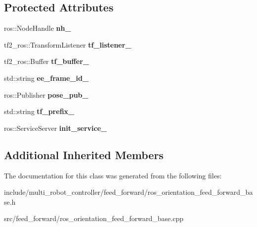 \subsection*{Protected Attributes}
\begin{DoxyCompactItemize}
\item 
\mbox{\label{classRosOrientationFeedForwardBase_afa860a801df238863c9f4d914b84cad2}} 
ros\+::\+Node\+Handle {\bfseries nh\+\_\+}
\item 
\mbox{\label{classRosOrientationFeedForwardBase_a056eabe353a9b022e78f00432cc0451e}} 
tf2\+\_\+ros\+::\+Transform\+Listener {\bfseries tf\+\_\+listener\+\_\+}
\item 
\mbox{\label{classRosOrientationFeedForwardBase_af31a9db484070b9498d11c89d3c60def}} 
tf2\+\_\+ros\+::\+Buffer {\bfseries tf\+\_\+buffer\+\_\+}
\item 
\mbox{\label{classRosOrientationFeedForwardBase_a746bcb2db8165ad31cbe285be7ed9c23}} 
std\+::string {\bfseries ee\+\_\+frame\+\_\+id\+\_\+}
\item 
\mbox{\label{classRosOrientationFeedForwardBase_a71880189563e228e26ce9561e085a625}} 
ros\+::\+Publisher {\bfseries pose\+\_\+pub\+\_\+}
\item 
\mbox{\label{classRosOrientationFeedForwardBase_a0ac4ea0415e293dbe56fa214c1acb3fc}} 
std\+::string {\bfseries tf\+\_\+prefix\+\_\+}
\item 
\mbox{\label{classRosOrientationFeedForwardBase_ae3a57b29bd7a416e5dd8833d45e16754}} 
ros\+::\+Service\+Server {\bfseries init\+\_\+service\+\_\+}
\end{DoxyCompactItemize}
\subsection*{Additional Inherited Members}


The documentation for this class was generated from the following files\+:\begin{DoxyCompactItemize}
\item 
include/multi\+\_\+robot\+\_\+controller/feed\+\_\+forward/ros\+\_\+orientation\+\_\+feed\+\_\+forward\+\_\+base.\+h\item 
src/feed\+\_\+forward/ros\+\_\+orientation\+\_\+feed\+\_\+forward\+\_\+base.\+cpp\end{DoxyCompactItemize}
